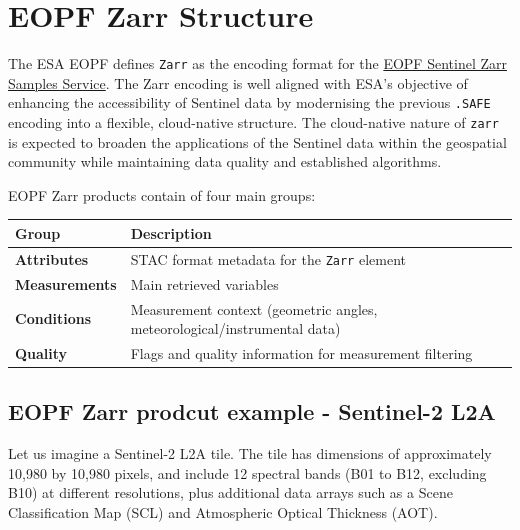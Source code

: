 \documentclass[
  letterpaper,
  DIV=11,
  numbers=noendperiod]{scrreprt}
\begin{document}
\section{EOPF Zarr Structure}\label{eopf-zarr-structure}

The ESA EOPF defines \texttt{Zarr} as the encoding format for the
\href{https://zarr.eopf.copernicus.eu/}{EOPF Sentinel Zarr Samples
Service}. The Zarr encoding is well aligned with ESA's objective of
enhancing the accessibility of Sentinel data by modernising the previous
\texttt{.SAFE} encoding into a flexible, cloud-native structure. The
cloud-native nature of \texttt{zarr} is expected to broaden the
applications of the Sentinel data within the geospatial community while
maintaining data quality and established algorithms.

EOPF Zarr products contain of four main groups:

\begin{longtable}[]{@{}
  >{\raggedright\arraybackslash}p{}
  >{\raggedright\arraybackslash}p{}@{}}
\toprule\noalign{}
\begin{minipage}[b]{\linewidth}\raggedright
Group
\end{minipage} & \begin{minipage}[b]{\linewidth}\raggedright
Description
\end{minipage} \\
\midrule\noalign{}
\endhead
\bottomrule\noalign{}
\endlastfoot
\textbf{Attributes} & STAC format metadata for the \texttt{Zarr}
element \\
\textbf{Measurements} & Main retrieved variables \\
\textbf{Conditions} & Measurement context (geometric angles,
meteorological/instrumental data) \\
\textbf{Quality} & Flags and quality information for measurement
filtering \\
\end{longtable}

\subsection{EOPF Zarr prodcut example - Sentinel-2
L2A}\label{eopf-zarr-prodcut-example---sentinel-2-l2a}

Let us imagine a Sentinel-2 L2A tile. The tile has dimensions of
approximately 10,980 by 10,980 pixels, and include 12 spectral bands
(B01 to B12, excluding B10) at different resolutions, plus additional
data arrays such as a Scene Classification Map (SCL) and Atmospheric
Optical Thickness (AOT).
\end{document}

